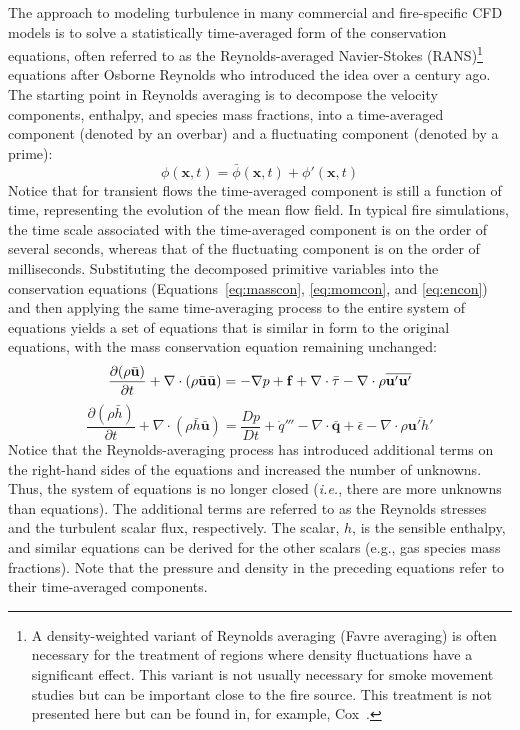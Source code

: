 \documentclass[graybox]{svmult}
\begin{document}
The approach to modeling turbulence in many commercial and fire-specific CFD models is to solve a statistically time-averaged form of the conservation equations, often referred to as the Reynolds-averaged Navier-Stokes (RANS)\footnote{A density-weighted variant of Reynolds averaging (Favre averaging) is often necessary for the treatment of regions where density fluctuations have a significant effect. This variant is not usually necessary for smoke movement studies but can be important close to the fire source. This treatment is not presented here but can be found in, for example, Cox~\cite{Cox:1995}.} equations after Osborne Reynolds who introduced the idea over a century ago. The starting point in Reynolds averaging is to decompose the velocity components, enthalpy, and species mass fractions, into a time-averaged component (denoted by an overbar) and a fluctuating component (denoted by a prime):
\begin{equation}
\phi(\mathbf{x},t) = \bar{\phi}(\mathbf{x},t) + \phi'(\mathbf{x},t)
\label{eq:phidef}
\end{equation}
Notice that for transient flows the time-averaged component is still a function of time, representing the evolution of the mean flow field. In typical fire simulations, the time scale associated with the time-averaged component is on the order of several seconds, whereas that of the fluctuating component is on the order of milliseconds. Substituting the decomposed primitive variables into the conservation equations (Equations~\ref{eq:masscon}, \ref{eq:momcon}, and \ref{eq:encon}) and then applying the same time-averaging process to the entire system of equations yields a set of equations that is similar in form to the original equations, with the mass conservation equation remaining unchanged:
\begin{equation}
\frac{\partial (\rho \bar{\mathbf{u}})}{\partial t} + \nabla \cdot (\rho \bar{\mathbf{u}} \bar{\mathbf{u}}) = -\nabla p + \mathbf{f} + \nabla \cdot \bar{\tens{\tau}}
- \nabla \cdot \rho \overline{ \mathbf{u}' \mathbf{u}' }
\label{eq:filmomcon}
\end{equation}
\begin{equation}
\frac{\partial (\rho \bar{h})}{\partial t} + \nabla \cdot (\rho \bar{h} \bar{\mathbf{u}}) = \frac{Dp}{Dt} + \dot{q}''' - \nabla \cdot \bar{\mathbf{q}}
+ \bar{\epsilon} - \nabla \cdot \rho \overline{ \mathbf{u}' h' }
\label{eq:filencon}
\end{equation}
Notice that the Reynolds-averaging process has introduced additional terms on the right-hand sides of the equations and increased the number of unknowns. Thus, the system of equations is no longer closed ({\em i.e.}, there are more unknowns than equations). The additional terms are referred to as the Reynolds stresses and the turbulent scalar flux, respectively. The scalar, $h$, is the sensible enthalpy, and similar equations can be derived for the other scalars ({e.g.}, gas species mass fractions). Note that the pressure and density in the preceding equations refer to their time-averaged components.
\end{document}
